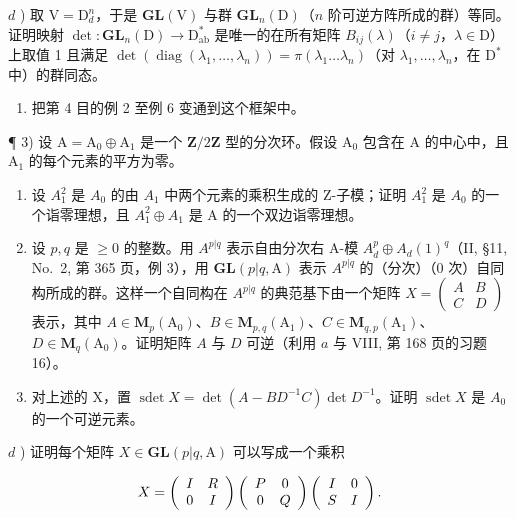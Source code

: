 \(d\) ) 取 \(\mathrm{V} = \mathrm{D}_d^n\)，于是 \(\mathbf{GL}(\mathrm{V})\) 与群 \(\mathbf{GL}_n(\mathrm{D})\)（\(n\) 阶可逆方阵所成的群）等同。证明映射 \(\operatorname{det}:\mathbf{GL}_n(\mathrm{D})\to \mathrm{D}_{\mathrm{ab}}^*\) 是唯一的在所有矩阵 \(B_{ij}(\lambda)\)（\(i\neq j\)，\(\lambda \in \mathrm{D}\)）上取值 1 且满足 \(\operatorname{det}(\operatorname{diag}(\lambda_1,\dots ,\lambda_n)) = \pi (\lambda_1\dots \lambda_n)\)（对 \(\lambda_1,\ldots ,\lambda_n\)，在 \(\mathrm{D}^*\) 中）的群同态。

\begin{enumerate}
\def\labelenumi{\alph{enumi})}
\setcounter{enumi}{4}
\tightlist
\item
  把第 4 目的例 2 至例 6 变通到这个框架中。
\end{enumerate}

¶ 3) 设 \(\mathrm{A} = \mathrm{A}_0 \oplus \mathrm{A}_1\) 是一个 \(\mathbf{Z}/2\mathbf{Z}\) 型的分次环。假设 \(\mathrm{A}_0\) 包含在 \(\mathrm{A}\) 的中心中，且 \(\mathrm{A}_1\) 的每个元素的平方为零。

\begin{enumerate}
\def\labelenumi{\alph{enumi})}
\item
  设 \(A_{1}^{2}\) 是 \(A_{0}\) 的由 \(A_{1}\) 中两个元素的乘积生成的 Z-子模；证明 \(A_{1}^{2}\) 是 \(A_{0}\) 的一个诣零理想，且 \(A_{1}^{2} \oplus A_{1}\) 是 A 的一个双边诣零理想。
\item
  设 \(p, q\) 是 \(\geqslant 0\) 的整数。用 \(A^{p|q}\) 表示自由分次右 A-模 \(A_d^p \oplus A_d(1)^q\)（II, §11, No.~2, 第 365 页，例 3），用 \(\mathbf{GL}(p|q, \mathrm{A})\) 表示 \(A^{p|q}\) 的（分次）（0 次）自同构所成的群。这样一个自同构在 \(A^{p|q}\) 的典范基下由一个矩阵 \(X = \begin{pmatrix} A & B \\ C & D \end{pmatrix}\) 表示，其中 \(A \in \mathbf{M}_p(\mathrm{A}_0)\)、\(B \in \mathbf{M}_{p,q}(\mathrm{A}_1)\)、\(C \in \mathbf{M}_{q,p}(\mathrm{A}_1)\)、\(D \in \mathbf{M}_q(\mathrm{A}_0)\)。证明矩阵 \(A\) 与 \(D\) 可逆（利用 \(a\) 与 VIII, 第 168 页的习题 16）。
\item
  对上述的 X，置 \(\operatorname{sdet} X = \det(A - BD^{-1}C) \det D^{-1}\)。证明 \(\operatorname{sdet} X\) 是 \(A_{0}\) 的一个可逆元素。
\end{enumerate}

\(d\) ) 证明每个矩阵 \(X\in \mathbf{GL}(p|q,\mathrm{A})\) 可以写成一个乘积

\[
X = \left( \begin{array}{c c} I & R \\ 0 & I \end{array} \right) \left( \begin{array}{c c} P & 0 \\ 0 & Q \end{array} \right) \left( \begin{array}{c c} I & 0 \\ S & I \end{array} \right).
\]

